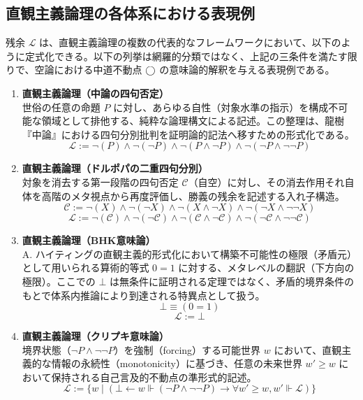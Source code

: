 \documentclass[11pt,a4paper]{article}
\newcommand{\lhagma}{\mathcal{L}}
\theoremstyle{definition}
\begin{document}
\subsection{直観主義論理の各体系における表現例}

残余 $\lhagma$ は、直観主義論理の複数の代表的なフレームワークにおいて、以下のように定式化できる。以下の列挙は網羅的分類ではなく、上記の三条件を満たす限りで、空論における中道不動点 $\bigcirc$ の意味論的解釈を与える表現例である。

\begin{enumerate}[label=\arabic*)]
    \item \textbf{直観主義論理（中論の四句否定）} \\
    世俗の任意の命題 $P$ に対し、あらゆる自性（対象水準の指示）を構成不可能な領域として排他する、純粋な論理構文による記述。この整理は、龍樹『中論』における四句分別批判を証明論的記法へ移すための形式化である\cite{nagarjuna}。
    \[
    \lhagma := \neg(P) \wedge \neg(\neg P) \wedge \neg(P \wedge \neg P) \wedge \neg(\neg P \wedge \neg\neg P)
    \]

    \item \textbf{直観主義論理（ドルポパの二重四句分別）} \\
    対象を消去する第一段階の四句否定 $\mathcal{C}$（自空）に対し、その消去作用それ自体を高階のメタ視点から再度評価し、勝義の残余を記述する入れ子構造。
    \[
    \mathcal{C} := \neg(X) \wedge \neg(\neg X) \wedge \neg(X \wedge \neg X) \wedge \neg(\neg X \wedge \neg\neg X)
    \]
    \[
    \lhagma := \neg(\mathcal{C}) \wedge \neg(\neg \mathcal{C}) \wedge \neg(\mathcal{C} \wedge \neg \mathcal{C}) \wedge \neg(\neg \mathcal{C} \wedge \neg\neg \mathcal{C})
    \]

    \item \textbf{直観主義論理（BHK意味論）} \\
    A. ハイティングの直観主義的形式化において構築不可能性の極限（矛盾元）として用いられる算術的等式 $0=1$ に対する、メタレベルの翻訳（下方向の極限）\cite{heyting}。ここでの $\bot$ は無条件に証明される定理ではなく、矛盾的境界条件のもとで体系内推論により到達される特異点として扱う。
    \[
    \bot \equiv (0 = 1)
    \]
    \[
    \lhagma := \bot
    \]

    \item \textbf{直観主義論理（クリプキ意味論）} \\
    境界状態（$\neg P \wedge \neg\neg P$）を強制（forcing）する可能世界 $w$ において、直観主義的な情報の永続性（monotonicity）に基づき、任意の未来世界 $w' \ge w$ において保持される自己言及的不動点の準形式的記述。
    \[
    \lhagma := \{ w \mid (\bot \leftarrow w \Vdash (\neg P \wedge \neg\neg P) \to \forall w' \ge w, w' \Vdash \lhagma) \}
    \]
\end{enumerate}
\end{document}
